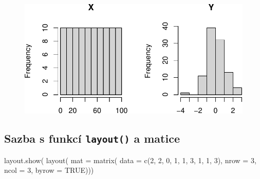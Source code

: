 \documentclass[
  letterpaper,
  DIV=11,
  numbers=noendperiod]{scrreprt}
\newenvironment{Shaded}{\begin{snugshade}}{\end{snugshade}}
\newcommand{\AttributeTok}[1]{\textcolor[rgb]{0.40,0.45,0.13}{#1}}
\newcommand{\ConstantTok}[1]{\textcolor[rgb]{0.56,0.35,0.01}{#1}}
\newcommand{\DecValTok}[1]{\textcolor[rgb]{0.68,0.00,0.00}{#1}}
\newcommand{\FunctionTok}[1]{\textcolor[rgb]{0.28,0.35,0.67}{#1}}
\newcommand{\NormalTok}[1]{\textcolor[rgb]{0.00,0.23,0.31}{#1}}
\begin{document}
\begin{figure}[H]

{\centering \includegraphics{03_grafy_files/figure-pdf/unnamed-chunk-7-1.pdf}

}

\end{figure}

\hypertarget{sazba-s-funkcuxed-layout-a-matice}{%
\subsection{\texorpdfstring{Sazba s funkcí \texttt{layout()} a
matice}{Sazba s funkcí layout() a matice}}\label{sazba-s-funkcuxed-layout-a-matice}}

\begin{Shaded}
\begin{Highlighting}[]
\FunctionTok{layout.show}\NormalTok{(}
  \FunctionTok{layout}\NormalTok{(}
    \AttributeTok{mat =} \FunctionTok{matrix}\NormalTok{(}
      \AttributeTok{data =} \FunctionTok{c}\NormalTok{(}\DecValTok{2}\NormalTok{, }\DecValTok{2}\NormalTok{, }\DecValTok{0}\NormalTok{,}
               \DecValTok{1}\NormalTok{, }\DecValTok{1}\NormalTok{, }\DecValTok{3}\NormalTok{,}
               \DecValTok{1}\NormalTok{, }\DecValTok{1}\NormalTok{, }\DecValTok{3}\NormalTok{), }
      \AttributeTok{nrow =} \DecValTok{3}\NormalTok{, }
      \AttributeTok{ncol =} \DecValTok{3}\NormalTok{, }
      \AttributeTok{byrow =} \ConstantTok{TRUE}\NormalTok{)))}
\end{Highlighting}
\end{Shaded}
\end{document}
